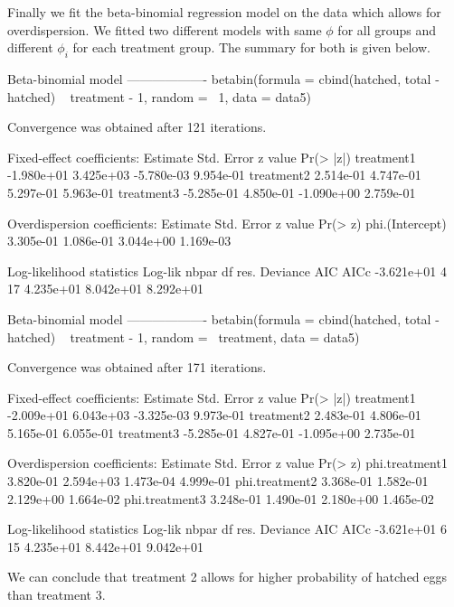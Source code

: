 \documentclass{article}
\begin{document}
Finally we fit the beta-binomial regression model on the data which allows for overdispersion. We fitted two different models with same $\phi$ for all groups and different $\phi_i$ for each treatment group. The summary for both is given below. 
\begin{Schunk}
\begin{Soutput}
Beta-binomial model
-------------------
betabin(formula = cbind(hatched, total - hatched) ~ treatment - 
    1, random = ~1, data = data5)

Convergence was obtained after 121 iterations.

Fixed-effect coefficients:
             Estimate Std. Error    z value Pr(> |z|)
treatment1 -1.980e+01  3.425e+03 -5.780e-03 9.954e-01
treatment2  2.514e-01  4.747e-01  5.297e-01 5.963e-01
treatment3 -5.285e-01  4.850e-01 -1.090e+00 2.759e-01

Overdispersion coefficients:
                 Estimate Std. Error   z value   Pr(> z)
phi.(Intercept) 3.305e-01  1.086e-01 3.044e+00 1.169e-03

Log-likelihood statistics
   Log-lik      nbpar    df res.   Deviance        AIC       AICc 
-3.621e+01          4         17  4.235e+01  8.042e+01  8.292e+01 
\end{Soutput}
\begin{Soutput}
Beta-binomial model
-------------------
betabin(formula = cbind(hatched, total - hatched) ~ treatment - 
    1, random = ~treatment, data = data5)

Convergence was obtained after 171 iterations.

Fixed-effect coefficients:
             Estimate Std. Error    z value Pr(> |z|)
treatment1 -2.009e+01  6.043e+03 -3.325e-03 9.973e-01
treatment2  2.483e-01  4.806e-01  5.165e-01 6.055e-01
treatment3 -5.285e-01  4.827e-01 -1.095e+00 2.735e-01

Overdispersion coefficients:
                Estimate Std. Error   z value   Pr(> z)
phi.treatment1 3.820e-01  2.594e+03 1.473e-04 4.999e-01
phi.treatment2 3.368e-01  1.582e-01 2.129e+00 1.664e-02
phi.treatment3 3.248e-01  1.490e-01 2.180e+00 1.465e-02

Log-likelihood statistics
   Log-lik      nbpar    df res.   Deviance        AIC       AICc 
-3.621e+01          6         15  4.235e+01  8.442e+01  9.042e+01 
\end{Soutput}
\end{Schunk}
We can conclude that treatment 2 allows for higher probability of hatched eggs than treatment 3.\\
\end{document}
